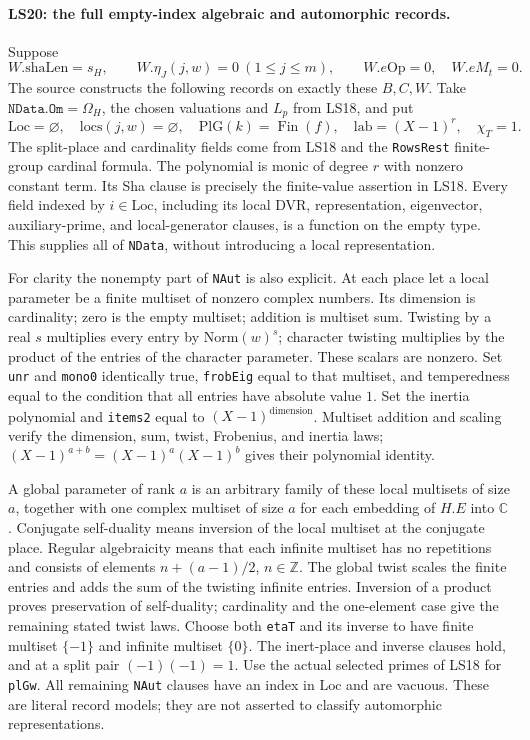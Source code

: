\paragraph{LS20: the full empty-index algebraic and automorphic records.}
Suppose
\[
 W.\mathrm{shaLen}=s_H,\qquad
 W.\eta_J(j,w)=0\ (1\le j\le m),\qquad
 W.e\mathrm{Op}=0,\quad W.eM_t=0.                    \tag{LS.44}
\]
The source constructs the following records on exactly these
$B,C,W$. Take $\texttt{NData.Om}=\Omega_H$, the chosen
valuations and $L_p$ from LS18, and put
\[
 \mathrm{Loc}=\varnothing,\quad\mathrm{locs}(j,w)=\varnothing,
 \quad\mathrm{PlG}(k)=\operatorname{Fin}(f),\quad
 \mathrm{lab}=(X-1)^r,\quad\chi_T=1.                  \tag{LS.45}
\]
The split-place and cardinality fields come from LS18 and the
\texttt{RowsRest} finite-group cardinal formula. The polynomial
is monic of degree $r$ with nonzero constant term. Its Sha clause
is precisely the finite-value assertion in LS18. Every field
indexed by $i\in\mathrm{Loc}$, including its local DVR,
representation, eigenvector, auxiliary-prime, and local-generator
clauses, is a function on the empty type. This supplies all of
\texttt{NData}, without introducing a local representation.

For clarity the nonempty part of \texttt{NAut} is also explicit.
At each place let a local parameter be a finite multiset of
nonzero complex numbers. Its dimension is cardinality; zero
is the empty multiset; addition is multiset sum. Twisting by a
real $s$ multiplies every entry by $\mathrm{Norm}(w)^s$;
character twisting multiplies by the product of the entries of
the character parameter. These scalars are nonzero. Set
\texttt{unr} and \texttt{mono0} identically true,
\texttt{frobEig} equal to that multiset, and temperedness equal
to the condition that all entries have absolute value $1$.
Set the inertia polynomial and \texttt{items2} equal to
$(X-1)^{\mathrm{dimension}}$. Multiset addition and scaling
verify the dimension, sum, twist, Frobenius, and inertia laws;
$(X-1)^{a+b}=(X-1)^a(X-1)^b$ gives their polynomial identity.

A global parameter of rank $a$ is an arbitrary family of these
local multisets of size $a$, together with one complex multiset
of size $a$ for each embedding of $H.E$ into $\mathbb C$.
Conjugate self-duality means inversion of the local multiset at
the conjugate place. Regular algebraicity means that each
infinite multiset has no repetitions and consists of elements
$n+(a-1)/2$, $n\in\mathbb Z$. The global twist scales the
finite entries and adds the sum of the twisting infinite entries.
Inversion of a product proves preservation of self-duality;
cardinality and the one-element case give the remaining stated
twist laws. Choose both \texttt{etaT} and its inverse to have
finite multiset $\{-1\}$ and infinite multiset $\{0\}$.
The inert-place and inverse clauses hold, and at a split pair
$(-1)(-1)=1$. Use the actual selected primes of LS18 for
\texttt{plGw}. All remaining \texttt{NAut} clauses have an
index in $\mathrm{Loc}$ and are vacuous. These are literal record
models; they are not asserted to classify automorphic representations.

